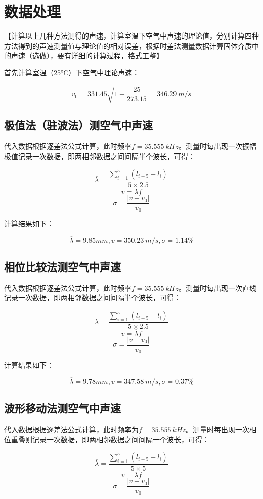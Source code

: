 \documentclass{ctexart}
\begin{document}
\section{数据处理}

【计算以上几种方法测得的声速，计算室温下空气中声速的理论值，分别计算四种方法得到的声速测量值与理论值的相对误差，根据时差法测量数据计算固体介质中的声速（选做），要有详细的计算过程，格式工整】

首先计算室温（25°C）下空气中理论声速：

$$ v_0 = 331.45\sqrt{1+\frac{25}{273.15}} = 346.29\ m/s $$

\subsection{极值法（驻波法）测空气中声速}

代入数据根据逐差法公式计算，此时频率$f=35.555\ kHz$。测量时每出现一次振幅极值记录一次数据，即两相邻数据之间间隔半个波长，可得： 

$$ \overline{\lambda} = \frac{\sum\limits_{i=1}^{5}(l_{i+5}-l_i)}{5 \times 2.5} $$
$$ v = \overline{\lambda} f $$
$$ \sigma = \frac{|v - v_0|}{v_0} $$

计算结果如下：

$$ \overline{\lambda} = 9.85 mm , v = 350.23 \ m/s,\sigma = 1.14\% $$

\subsection{相位比较法测空气中声速}

代入数据根据逐差法公式计算，此时频率$f=35.555\ kHz$。测量时每出现一次直线记录一次数据，即两相邻数据之间间隔半个波长，可得：

$$ \overline{\lambda} = \frac{\sum\limits_{i=1}^{5}(l_{i+5}-l_i)}{5 \times 2.5} $$
$$ v = \overline{\lambda} f $$
$$ \sigma = \frac{|v - v_0|}{v_0} $$

计算结果如下：

$$ \overline{\lambda} = 9.78 mm , v = 347.58 \ m/s,\sigma = 0.37\% $$

\subsection{波形移动法测空气中声速}

代入数据根据逐差法公式计算，此时频率为$f=35.555\ kHz$。测量时每出现一次相位重叠则记录一次数据，即两相邻数据之间间隔一个波长，可得： 

$$ \overline{\lambda} = \frac{\sum\limits_{i=1}^{5}(l_{i+5}-l_i)}{5 \times 5} $$
$$ v = \overline{\lambda} f $$
$$ \sigma = \frac{|v - v_0|}{v_0} $$
\end{document}
